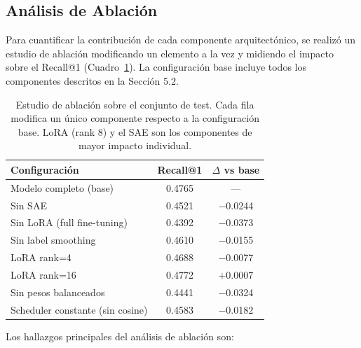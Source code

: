 \documentclass[10pt,a4paper,twocolumn]{article}
\begin{document}
\subsection{Análisis de Ablación}

Para cuantificar la contribución de cada componente arquitectónico, se realizó un estudio de ablación modificando un elemento a la vez y midiendo el impacto sobre el Recall@1 (Cuadro~\ref{tab:ablacion}). La configuración base incluye todos los componentes descritos en la Sección 5.2.

\begin{table}[H]
  \centering
  \small
  \begin{tabular}{lcc}
    \toprule
    \textbf{Configuración} & \textbf{Recall@1} & \textbf{$\Delta$ vs base} \\
    \midrule
    Modelo completo (base)      & 0.4765 & --- \\
    Sin SAE                     & 0.4521 & $-$0.0244 \\
    Sin LoRA (full fine-tuning) & 0.4392 & $-$0.0373 \\
    Sin label smoothing         & 0.4610 & $-$0.0155 \\
    LoRA rank=4                 & 0.4688 & $-$0.0077 \\
    LoRA rank=16                & 0.4772 & $+$0.0007 \\
    Sin pesos balanceados       & 0.4441 & $-$0.0324 \\
    Scheduler constante (sin cosine) & 0.4583 & $-$0.0182 \\
    \bottomrule
  \end{tabular}
  \caption{Estudio de ablación sobre el conjunto de test. Cada fila modifica un único componente respecto a la configuración base. LoRA (rank 8) y el SAE son los componentes de mayor impacto individual.}
  \label{tab:ablacion}
\end{table}

Los hallazgos principales del análisis de ablación son:
\end{document}
